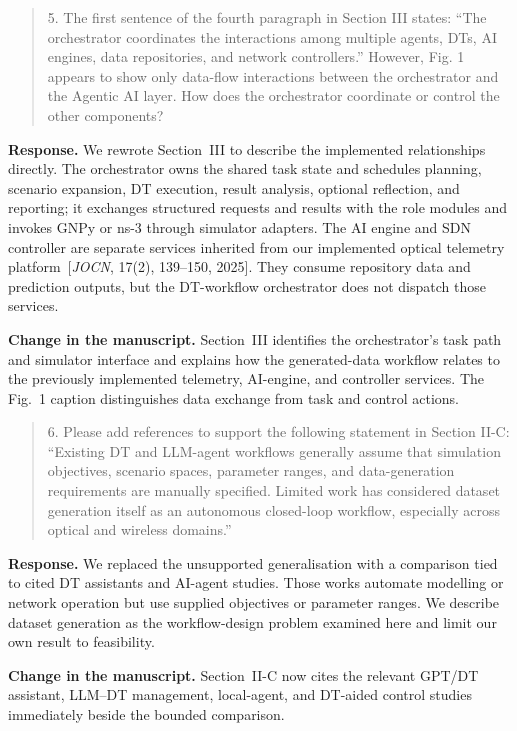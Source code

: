 \documentclass[11pt]{article}
\newenvironment{reviewercomment}{\begin{quote}\color{reviewblue}}{\end{quote}}
\newenvironment{authorresponse}{\color{responsegreen}\textbf{Response.} }{\par\color{black}}
\newcommand{\change}[1]{\par\textbf{Change in the manuscript.} #1\par}
\begin{document}
\begin{reviewercomment}
5. The first sentence of the fourth paragraph in Section III states: ``The orchestrator coordinates the interactions among multiple agents, DTs, AI engines, data repositories, and network controllers.'' However, Fig. 1 appears to show only data-flow interactions between the orchestrator and the Agentic AI layer. How does the orchestrator coordinate or control the other components?
\end{reviewercomment}
\begin{authorresponse}
We rewrote Section~III to describe the implemented relationships directly. The orchestrator owns the shared task state and schedules planning, scenario expansion, DT execution, result analysis, optional reflection, and reporting; it exchanges structured requests and results with the role modules and invokes GNPy or ns-3 through simulator adapters. The AI engine and SDN controller are separate services inherited from our implemented optical telemetry platform~[\emph{JOCN}, 17(2), 139--150, 2025]. They consume repository data and prediction outputs, but the DT-workflow orchestrator does not dispatch those services.
\end{authorresponse}
\change{Section~III identifies the orchestrator's task path and simulator interface and explains how the generated-data workflow relates to the previously implemented telemetry, AI-engine, and controller services. The Fig.~1 caption distinguishes data exchange from task and control actions.}

\begin{reviewercomment}
6. Please add references to support the following statement in Section II-C: ``Existing DT and LLM-agent workflows generally assume that simulation objectives, scenario spaces, parameter ranges, and data-generation requirements are manually specified. Limited work has considered dataset generation itself as an autonomous closed-loop workflow, especially across optical and wireless domains.''
\end{reviewercomment}
\begin{authorresponse}
We replaced the unsupported generalisation with a comparison tied to cited DT assistants and AI-agent studies. Those works automate modelling or network operation but use supplied objectives or parameter ranges. We describe dataset generation as the workflow-design problem examined here and limit our own result to feasibility.
\end{authorresponse}
\change{Section~II-C now cites the relevant GPT/DT assistant, LLM--DT management, local-agent, and DT-aided control studies immediately beside the bounded comparison.}
\end{document}
